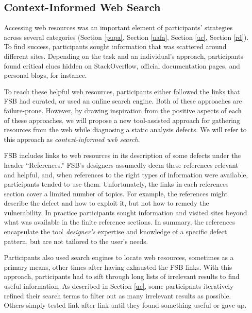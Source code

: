 \documentclass[10pt,journal,compsoc]{IEEEtran}
\begin{document}
\subsection{Context-Informed Web Search}
Accessing web resources was an important element of participants' strategies across several categories (Section \ref{pupa}, Section \ref{uafa}, Section \ref{uc}, Section \ref{rd}).
To find success, participants sought information that was scattered around different sites.
Depending on the task and an individual's approach, participants found critical clues hidden on StackOverflow, official documentation pages, and personal blogs, for instance. 

To reach these helpful web resources, participants either followed the links that FSB had curated, or used an online search engine. 
Both of these approaches are failure-prone.
However, by drawing inspiration from the positive aspects of each of these approaches, we will propose a new tool-assisted approach for gathering resources from the web while diagnosing a static analysis defects. 
We will refer to this approach as \textit{context-informed web search}.

FSB includes links to web resources in its description of some defects under the header ``References.''
FSB's designers assumedly deem these references relevant and helpful, and, when references to the right types of information were available, participants tended to use them.
Unfortunately, the links in each references section cover a limited number of topics.
For example, the references might describe the defect and how to exploit it, but not how to remedy the vulnerability.
In practice participants sought information and visited sites beyond what was available in the finite reference sections.
In summary, the references encapsulate the tool \textit{designer's} expertise and knowledge of a specific defect pattern, but are not tailored to the user's needs.


Participants also used search engines to locate web resources, sometimes as a primary means, other times after having exhausted the FSB links.
With this approach, participants had to sift through long lists of irrelevant results to find useful information.
As described in Section \ref{uc}, some participants iteratively refined their search terms to filter out as many irrelevant results as possible.
Others simply tested link after link until they found something useful or gave up.
\end{document}
